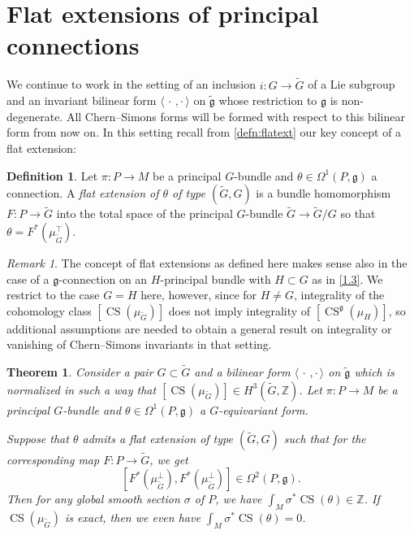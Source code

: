 \documentclass[british,11pt,a4paper]{amsart}
\numberwithin{equation}{section}
\renewcommand\frak{\mathfrak}
\renewcommand\Bbb{\mathbb}
\renewcommand{\th}{\theta}
\newcommand{\si}{\sigma}
\newcommand{\Om}{\Omega}
\newcommand{\B}[2]{\langle#1,#2\rangle}
\newcommand{\CS}{\operatorname{CS}}
\newcommand{\tfg}{\widetilde{\mathfrak g}}
\newcommand{\Z}{\mathbb{Z}}
\newcommand{\col}{:}
\newcounter{theorem}
\numberwithin{theorem}{section}
\newtheorem{thm}[theorem]{Theorem}
\theoremstyle{definition}
\newtheorem*{defNON}{Definition}
\theoremstyle{remark}
\newtheorem{remark}[theorem]{Remark}
\begin{document}
\section{Flat extensions of principal
connections}\label{sect:flatextensionGequlasH}

 We continue to work in the setting of an inclusion $i\col G\to\tilde G$ of
a Lie subgroup and an invariant bilinear form $\B{\,\cdot\,}{\cdot\,}$ on $\tilde{\frak{g}}$
whose restriction to $\frak{g}$ is non-degenerate. All Chern--Simons forms will be
formed with respect to this bilinear form from now on. In this setting recall from \cref{defn:flatext} our key concept of a flat extension:

\begin{defNON}\label{def:flat-ext}
Let $\pi : P \to M$ be a principal $G$-bundle and $\theta \in \Omega^1(P,\mathfrak{g})$ a connection. A \emph{flat extension of $\theta$ of type $(\tilde{G},G)$} is a bundle homomorphism $F : P \to \tilde{G}$ into the total space of the principal $G$-bundle $\tilde{G} \to \tilde{G}/G$ so that $\theta=F^*(\mu_{\tilde{G}}^{\top})$.
\end{defNON}

\begin{remark}\label{rem:flat-ext}
The concept of flat extensions as defined here makes sense also in the case of a $\frak g$-connection on an $H$-principal bundle with $H\subset G$ as in \cref{1.3}. We restrict to the case $G=H$ here, however, since for $H\neq G$, integrality of the cohomology class $[\CS(\mu_{\tilde G})]$ does not imply integrality of $[\CS^{\frak g}(\mu_H)]$, so additional assumptions are needed to obtain a general result on integrality or vanishing of Chern--Simons invariants in that setting. \end{remark}



\begin{thm}\label{thm:main-flat}
Consider a pair $G\subset\widetilde{G}$ and a bilinear form $\B{\,\cdot\,}{\cdot\,}$ on
$\tfg$ which is normalized in such a way that $[\CS(\mu_{\tilde G})]\in
H^3(\tilde G,\Z)$. Let $\pi\col P\to M$ be a principal $G$-bundle and
$\theta\in\Om^1(P,\frak{g})$ a $G$-equivariant form.

Suppose that $\th$ admits a flat extension of type $(\widetilde{G},G)$
such that for the corresponding map $F:P\to\tilde G$, we get 
\begin{equation}\label{cond:flatextcond}
[F^*(\mu_{\tilde G}^\perp),F^*(\mu_{\tilde G}^\perp)]\in\Om^2(P,\frak{g}).
\end{equation}
Then for any global smooth section $\si$ of $P$, we have $\int_M\si^*\CS(\theta)\in \Bbb
Z$. If $\CS(\mu_{\widetilde{G}})$ is exact, then we even have
$\int_M\si^*\CS(\theta)=0$.
\end{thm}
 
\end{document}
